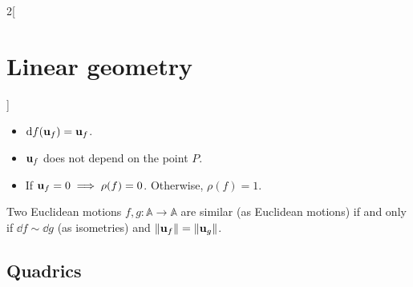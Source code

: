 \documentclass[../../../main.tex]{subfiles}
\begin{document}
\begin{multicols}{2}[\section{Linear geometry}]
\begin{prop}
\begin{itemize}
            \item $\dd f(\vb{u}_f)=\vb{u}_f$.
            \item $\vb{u}_f$ does not depend on the point $P$.
            \item If $\vb{u}_f=0\implies\rho(f)=0$. Otherwise, $\rho(f)=1$.
        \end{itemize}
    \end{prop}
    \begin{theorem}
        Two Euclidean motions $f,g:\mathbb{A}\rightarrow\mathbb{A}$ are similar (as Euclidean motions) if and only if $\dd f\sim \dd g$ (as isometries) and $\|\vb{u}_f\|=\|\vb{u}_g\|$.
    \end{theorem}
    \subsection{Quadrics}

\end{multicols}
\end{document}
